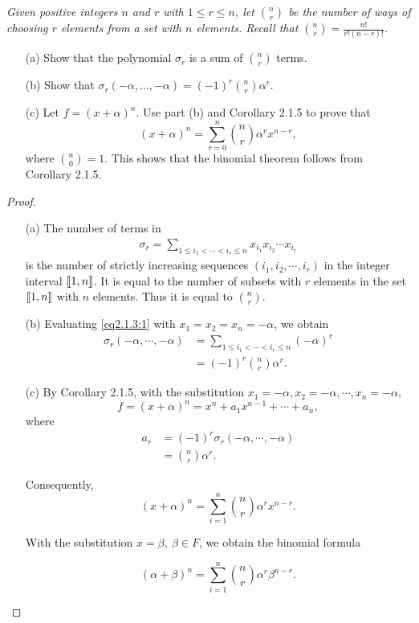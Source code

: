 \documentclass[11pt,a4paper]{article}
\def\gcro{\mbox{[\hspace{-.15em}[}}%
\def\dcro{\mbox{]\hspace{-.15em}]}}
\begin{document}
{\it Given positive integers $n$ and $r$ with $1\leq r \leq n$, let $\binom{n}{r}$ be the number of ways of choosing $r$ elements from a set with $n$ elements. Recall that $\binom{n}{r} = \frac{n!}{r!(n-r)!}$.
\begin{enumerate}
\item[(a)] Show that the polynomial $\sigma_r$ is a sum of $\binom{n}{r}$ terms.
\item[(b)] Show that $\sigma_r(-\alpha,\ldots,-\alpha) = (-1)^r \binom{n}{r} \alpha^r$.
\item[(c)] Let $f = (x+\alpha)^n$. Use part (b) and Corollary 2.1.5 to prove that
$$(x+\alpha)^n = \sum_{r=0}^n \binom{n}{r} \alpha^r x^{n-r},$$
where $\binom{n}{0}=1$. This shows that the binomial theorem follows from Corollary 2.1.5.
\end{enumerate}
}

\begin{proof}
\begin{enumerate}
\item[(a)]
The number of terms in 
\begin{align}
\sigma_r = \sum_{1 \leq i_1 <  \cdots <i_r\leq n}x_{i_1}x_{i_2}\cdots x_{i_r} \label{eq2.1.3:1}
\end{align}
is the number of strictly increasing sequences $(i_1,i_2,\cdots,i_r)$ in the integer interval $\gcro1,n\dcro$. It is equal to the number of subsets with $r$ elements in the set $\gcro1,n\dcro$ with $n$ elements. Thus it is equal to $\binom{n}{r}$.


\item[(b)] Evaluating \eqref{eq2.1.3:1} with $x_1=x_2 = x_n = -\alpha$, we obtain
\begin{align*}
\sigma_r (-\alpha, \cdots,-\alpha)&= \sum_{1 \leq i_1 <  \cdots <i_r\leq n}(-\alpha)^r\\
&=(-1)^r \binom{n}{r} \alpha^r.
\end{align*}


\item[(c)]
By Corollary 2.1.5, with the substitution $x_1 = -\alpha, x_2 = -\alpha, \cdots, x_n = - \alpha$,
$$f = (x+\alpha)^n = x^n +a_1 x^{n-1}+\cdots +a_n,$$ where 
\begin{align*}
a_r &= (-1)^r \sigma_r(-\alpha,\cdots,-\alpha)\\
&=\binom{n}{r} \alpha^r.
\end{align*} 

Consequently, 
$$(x+ \alpha)^n = \sum_{i=1}^n \binom{n}{r} \alpha^r x^{n-r}.$$

With the substitution $x = \beta , \ \beta \in F$, we obtain the binomial formula

$$( \alpha+ \beta)^n = \sum_{i=1}^n \binom{n}{r} \alpha^r \beta^{n-r}.$$

\end{enumerate}
\end{proof}
\end{document}
